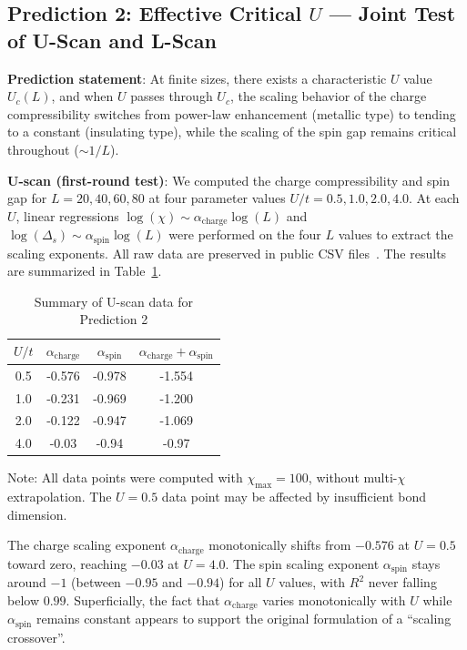 \documentclass[prb,reprint,twocolumn,superscriptaddress]{revtex4-2}
\begin{document}
\subsection{Prediction 2: Effective Critical $U$ --- Joint Test of U-Scan and L-Scan}

\textbf{Prediction statement}: At finite sizes, there exists a characteristic $U$ value $U_c(L)$, and when $U$ passes through $U_c$, the scaling behavior of the charge compressibility switches from power-law enhancement (metallic type) to tending to a constant (insulating type), while the scaling of the spin gap remains critical throughout ($\sim 1/L$).

\textbf{U-scan (first-round test)}: We computed the charge compressibility and spin gap for $L = 20, 40, 60, 80$ at four parameter values $U/t = 0.5, 1.0, 2.0, 4.0$. At each $U$, linear regressions $\log(\chi) \sim \alpha_{\mathrm{charge}} \log(L)$ and $\log(\Delta_s) \sim \alpha_{\mathrm{spin}} \log(L)$ were performed on the four $L$ values to extract the scaling exponents. All raw data are preserved in public CSV files~\cite{Li2026GitHub}. The results are summarized in Table~\ref{tab:U_scan}.

\begin{table}[htbp]
\caption{Summary of U-scan data for Prediction 2}
\label{tab:U_scan}
\begin{tabular}{cccc}
\toprule
$U/t$ & $\alpha_{\mathrm{charge}}$ & $\alpha_{\mathrm{spin}}$ & $\alpha_{\mathrm{charge}} + \alpha_{\mathrm{spin}}$ \\
\midrule
0.5 & -0.576 & -0.978 & -1.554 \\
1.0 & -0.231 & -0.969 & -1.200 \\
2.0 & -0.122 & -0.947 & -1.069 \\
4.0 & -0.03 & -0.94 & -0.97 \\
\bottomrule
\end{tabular}
\par
\smallskip
\small Note: All data points were computed with $\chi_{\max} = 100$, without multi-$\chi$ extrapolation. The $U = 0.5$ data point may be affected by insufficient bond dimension.
\end{table}

The charge scaling exponent $\alpha_{\mathrm{charge}}$ monotonically shifts from $-0.576$ at $U = 0.5$ toward zero, reaching $-0.03$ at $U = 4.0$. The spin scaling exponent $\alpha_{\mathrm{spin}}$ stays around $-1$ (between $-0.95$ and $-0.94$) for all $U$ values, with $R^2$ never falling below $0.99$. Superficially, the fact that $\alpha_{\mathrm{charge}}$ varies monotonically with $U$ while $\alpha_{\mathrm{spin}}$ remains constant appears to support the original formulation of a ``scaling crossover''.
\end{document}
